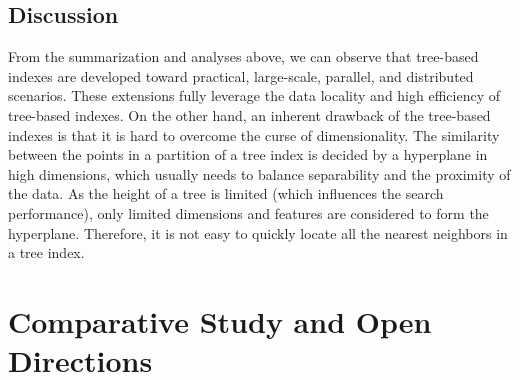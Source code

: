 \documentclass[11pt]{article}
\begin{document}
\subsection{Discussion}
\label{zeyu_sec:discuss}
From the summarization and analyses above, we can observe that tree-based indexes are developed toward practical, large-scale, parallel, and distributed scenarios.
These extensions fully leverage the data locality and high efficiency of tree-based indexes.
On the other hand, an inherent drawback of the tree-based indexes is that it is hard to overcome the curse of dimensionality.
The similarity between the points in a partition of a tree index is decided by a hyperplane in high dimensions, which usually needs to balance separability and the proximity of the data.
As the height of a tree is limited (which influences the search performance), only limited dimensions and features are considered to form the hyperplane.
Therefore, it is not easy to quickly locate all the nearest neighbors in a tree index.

\section{Comparative Study and Open Directions}
\label{zeyu_sec:compare}
\end{document}
